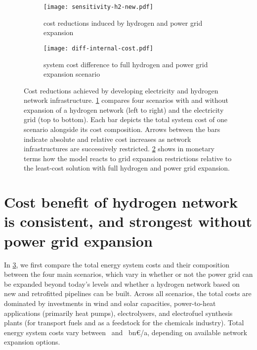 \begin{figure}
    \centering
    \begin{subfigure}[t]{\textwidth}
        \centering
        \caption{cost reductions induced by hydrogen and power grid expansion}
        \texttt{[image: sensitivity-h2-new.pdf]}
        \label{fig:sensitivity-h2-a}
    \end{subfigure}
    \begin{subfigure}[t]{\textwidth}
        \centering
        \caption{system cost difference to full hydrogen and power grid expansion scenario}
        \texttt{[image: diff-internal-cost.pdf]}
        \label{fig:sensitivity-h2-b}
    \end{subfigure}
    \caption{Cost reductions achieved by developing electricity and hydrogen
    network infrastructure. \cref{fig:sensitivity-h2-a} compares four scenarios
    with and without expansion of a hydrogen network (left to right) and the
    electricity grid (top to bottom). Each bar depicts the total system cost of
    one scenario alongside its cost composition. Arrows between the bars
    indicate absolute and relative cost increases as network infrastructures are
    successively restricted. \cref{fig:sensitivity-h2-b} shows in monetary terms
    how the model reacts to grid expansion restrictions relative to the
    least-cost solution with full hydrogen and power grid expansion.}
    \label{fig:sensitivity-h2}
\end{figure}

\section*{Cost benefit of hydrogen network is consistent, and strongest without power grid expansion}
\label{sec:h2}

In \cref{fig:sensitivity-h2}, we first compare the total energy system costs and
their composition between the four main scenarios, which vary in whether or not
the power grid can be expanded beyond today's levels and whether a hydrogen
network based on new and retrofitted pipelines can be built. Across all
scenarios, the total costs are dominated by investments in wind and solar
capacities, power-to-heat applications (primarily heat pumps), electrolysers,
and electrofuel synthesis plants (for transport fuels and as a feedstock for the
chemicals industry). Total energy system costs vary between \minsystemcost~and
\maxsystemcost~bn\euro/a, depending on available network expansion options.

